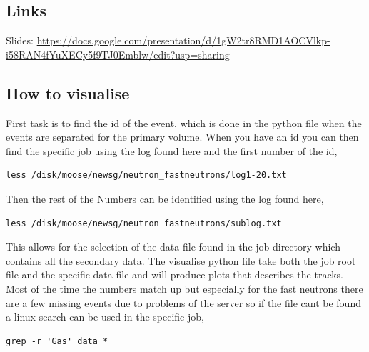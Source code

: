 \documentclass[a4paper]{article}
\begin{document}
\subsection{Links}
Slides: \url{https://docs.google.com/presentation/d/1gW2tr8RMD1AOCVlkp-i58RAN4fYuXECy5f9TJ0Emblw/edit?usp=sharing}
\begin{appendices}
\section{How to visualise}
First task is to find the id of the event, which is done in the python file when the events are separated for the primary volume. When you have an id you can then find the specific job using the log found here and the first number of the id, 
\begin{verbatim}
less /disk/moose/newsg/neutron_fastneutrons/log1-20.txt
\end{verbatim}
\noindent Then the rest of the Numbers can be identified using the log found here, 
\begin{verbatim}
less /disk/moose/newsg/neutron_fastneutrons/sublog.txt
\end{verbatim}
\noindent This allows for the selection of the data file found in the job directory which contains all the secondary data. The visualise python file take both the job root file and the specific data file and will produce plots that describes the tracks.
\newline Most of the time the numbers match up but especially for the fast neutrons there are a few missing events due to problems of the server so if the file cant be found a linux search can be used in the specific job,
\begin{verbatim}
grep -r 'Gas' data_*
\end{verbatim}
\end{appendices}

 
\end{document}
